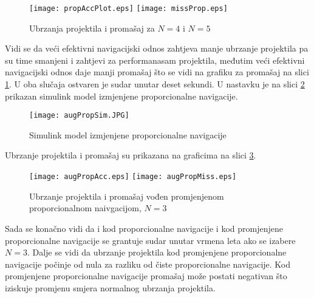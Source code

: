 \begin{figure}[htp!]
    \centering
    \texttt{[image: propAccPlot.eps]}
    \texttt{[image: missProp.eps]}
    \caption{Ubrzanja projektila i promašaj za $N=4$ i $N=5$}
    \label{fig:propAcc}
\end{figure}
Vidi se da veći efektivni navigacijski odnos zahtjeva manje ubrzanje projektila pa su time 
smanjeni i zahtjevi za performanasam projektila, međutim veći efektivni navigacijski odnos 
daje manji promašaj što se vidi na grafiku za promašaj na slici \ref{fig:propAcc}. 
U oba slučaja ostvaren je sudar unutar deset sekundi. U nastavku je na slici \ref{fig:simAugProp} prikazan 
simulink model izmjenjene proporcionalne navigacije.
\begin{figure}[h!]
    \centering
    \texttt{[image: augPropSim.JPG]}
    \caption{Simulink model izmjenjene proporcionalne navigacije}
    \label{fig:simAugProp}
\end{figure}
Ubrzanje projektila i promašaj su prikazana na graficima na slici \ref{fig:augPropGraf}.
\begin{figure}[h!]
    \centering
    \texttt{[image: augPropAcc.eps]}
    \texttt{[image: augPropMiss.eps]}
    \caption{Ubrzanje projektila i promašaj vođen promjenjenom proporcionalnom naivgacijom, $N=3$}
    \label{fig:augPropGraf}
\end{figure}
Sada se konačno vidi da i kod proporcionalne navigacije i kod promjenjene proporcionalne navigacije 
se grantuje sudar unutar vrmena leta ako se izabere $N=3$. Dalje se vidi da 
ubrzanje projektila kod promjenjene proporcionalne navigacije počinje od nula za razliku od čiste proporcionalne 
navigacije. Kod promjenjene proporcionalne navigacije promašaj može postati negativan što iziskuje 
promjenu smjera normalnog ubrzanja projektila. 
